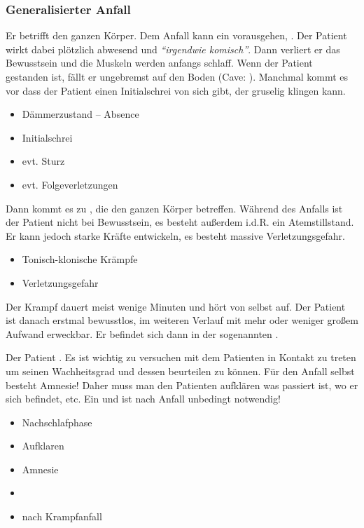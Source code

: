 \subsubsection{Generalisierter Anfall}
\label{topic:krampfanfall-generalisierter}

{
Er betrifft den ganzen Körper. Dem Anfall kann ein
vorausgehen, . Der Patient wirkt
dabei plötzlich abwesend und \emph{"`irgendwie komisch"'}.
Dann verliert er das Bewusstsein und die Muskeln werden
anfangs schlaff. Wenn der Patient gestanden ist, fällt er
ungebremst auf den Boden (Cave: ).
Manchmal kommt es vor dass der Patient einen
Initialschrei von sich gibt, der
gruselig klingen kann. 
}{
\begin{itemize}
  \item Dämmerzustand -- Absence
  \item Initialschrei
  \item evt. Sturz
  \item evt. Folgeverletzungen
\end{itemize}

}{}{}{}

{
Dann kommt es zu
,
die den ganzen Körper betreffen. Während des Anfalls ist der
Patient nicht bei Bewusstsein, es besteht außerdem i.d.R.
ein Atemstillstand. Er kann jedoch starke Kräfte entwickeln, es
besteht massive
Verletzungsgefahr.
}{
\begin{itemize}
  \item Tonisch-klonische Krämpfe
  \item Verletzungsgefahr
\end{itemize}
}{}{}{}


{
Der Krampf dauert meist wenige Minuten und hört von selbst
auf. Der Patient ist danach erstmal bewusstlos, im weiteren
Verlauf mit mehr oder weniger großem Aufwand erweckbar. Er
befindet sich dann in der sogenannten
.

Der Patient . Es ist
wichtig zu versuchen mit dem Patienten in Kontakt zu treten
um seinen Wachheitsgrad und dessen
 beurteilen zu können. Für den Anfall selbst besteht
Amnesie! Daher muss man den Patienten aufklären was passiert
ist, wo er sich befindet, etc. Ein  und
 ist nach \underline{} Anfall
unbedingt notwendig! 
}{
\begin{itemize}
  \item Nachschlafphase
  \item Aufklaren
  \item Amnesie
  \item {}
  \item {} nach \underline{} Krampfanfall
\end{itemize}
}{}{}{}


